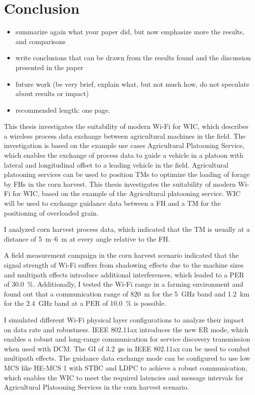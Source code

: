 \chapter{Conclusion}
\acresetall

\begin{itemize}
\item summarize again what your paper did, but now emphasize more the results, and comparisons
\item write conclusions that can be drawn from the results found and the discussion presented in the paper
\item future work (be very brief, explain what, but not much how, do not speculate about results or impact)
\item recommended length: one page.
\end{itemize}
This thesis investigates the suitability of modern Wi-Fi for \ac{WIC}, which describes a wireless process data exchange between agricultural machines in the field.
The investigation is based on the example use cases Agricultural Platooning Service,
which enables the exchange of process data to guide a vehicle in a platoon with lateral and longitudinal
offset to a leading vehicle in the field.
Agricultural platooning services can be used to position \ac{TM}s to optimize the loading of forage by \ac{FH}s in the corn harvest.
This thesis investigates the suitability of modern Wi-Fi for \ac{WIC}, based on the example of the Agricultural platooning service.
\ac{WIC} will be used to exchange guidance data between a \ac{FH} and a \ac{TM} for the positioning of overloaded grain.

I analyzed corn harvest process data, which indicated that the \ac{TM} is usually at a distance of \SIrange{5}{6}{\meter} at every angle relative to the \ac{FH}.

A field measurement campaign in the corn harvest scenario indicated that the signal strength of Wi-Fi suffers from shadowing effects due to the machine sizes and
multipath effects introduce additional interferences, which leaded to a \ac{PER} of \SI{30.0}{\percent}.
Additionally, I tested the Wi-Fi range in a farming environment and found out that a communication range of \SI{820}{\meter} for the \SI{5}{\giga\hertz} band and \SI{1.2}{\kilo\meter} for the \SI{2.4}{\giga\hertz} band
at a \ac{PER} of \SI{10.0}{\percent} is possible.

I simulated different Wi-Fi physical layer configurations to analyze their impact on data rate and robustness.
IEEE 802.11ax introduces the new \ac{ER} mode, which enables a robust and long-range communication for service discovery transmission when used with \ac{DCM}.
The \ac{GI} of \SI{3.2}{\micro\second} in IEEE 802.11ax can be used to combat multipath effects.
The guidance data exchange mode can be configured to use low \ac{MCS} like \ac{HE}-\ac{MCS} 1 with \ac{STBC} and \ac{LDPC} to achieve a robust communication,
which enables the \ac{WIC} to meet the required latencies and message intervals for Agricultural Platooning Services in the corn harvest scenario.








